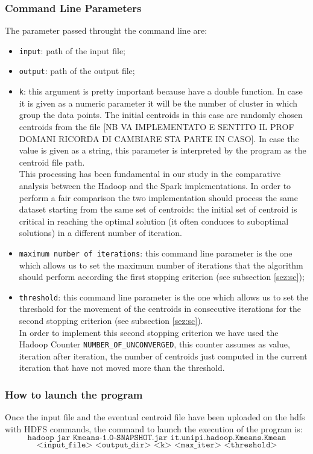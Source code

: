 \documentclass[11pt,a4paper]{article}
\begin{document}
\subsubsection{Command Line Parameters}\label{sez:clp}
The parameter passed throught the command line are:
\begin{itemize}
	\item \texttt{input}: path of the input file;
	\item \texttt{output}: path of the output file;
	\item \texttt{k}: this argument is pretty important because have a double function. In case it is given as a numeric parameter it will be the number of cluster in which group the data points. The initial centroids in this case are randomly chosen centroids from the file [NB VA IMPLEMENTATO E SENTITO IL PROF DOMANI RICORDA DI CAMBIARE STA PARTE IN CASO]. In case the value is given as a string, this parameter is interpreted by the program as the centroid file path.\\
	This processing has been fundamental in our study in the comparative analysis between the Hadoop and the Spark implementations. In order to perform a fair comparison the two implementation should process the same dataset starting from the same set of centroids: the initial set of centroid is critical in reaching the optimal solution (it often conduces to suboptimal solutions) in a different number of iteration. 
	\item \texttt{maximum number of iterations}: this command line parameter is the one which allows us to set the maximum number of iterations that the algorithm should perform according the first stopping criterion (see subsection \ref{sez:sc}); 
	\item \texttt{threshold}: this command line parameter is the one which allows us to set the threshold for the movement of the centroids in consecutive iterations for the second stopping criterion (see subsection \ref{sez:sc}).\\
	In order to implement this second stopping criterion we have used the Hadoop Counter \texttt{NUMBER\_OF\_UNCONVERGED}, this counter assumes as value, iteration after iteration, the number of centroids just computed in the current iteration that have not moved more than the threshold.
\end{itemize}
\subsubsection{How to launch the program}
Once the input file and the eventual centroid file have been uploaded on the hdfs with HDFS commands, the command to launch the execution of the program is:\[\texttt{hadoop jar Kmeans-1.0-SNAPSHOT.jar it.unipi.hadoop.Kmeans.Kmean}\] \[\texttt{<input\_file> <output\_dir> <k> <max\_iter> <threshold>}\]
\end{document}
